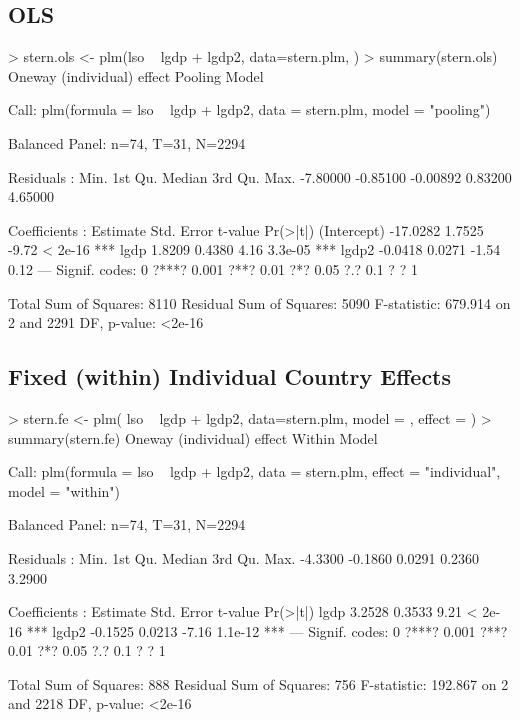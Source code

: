 \documentclass[landscape,letterpaper,9pt]{article}
\begin{document}
\subsection{OLS}
\begin{CVerbatim}
> stern.ols <- plm(lso ~ lgdp  + lgdp2, data=stern.plm, \fbox{\textcolor{red}{model = "pooling"}})
> summary(stern.ols)
Oneway (individual) effect Pooling Model

Call:
plm(formula = lso ~ lgdp + lgdp2, data = stern.plm, model = "pooling")

Balanced Panel: n=74, T=31, N=2294

Residuals :
    Min.  1st Qu.   Median  3rd Qu.     Max.
-7.80000 -0.85100 -0.00892  0.83200  4.65000

Coefficients :
            Estimate Std. Error t-value Pr(>|t|)
(Intercept) -17.0282     1.7525   -9.72  < 2e-16 ***
lgdp          1.8209     0.4380    4.16  3.3e-05 ***
lgdp2        -0.0418     0.0271   -1.54     0.12
---
Signif. codes:  0 ?***? 0.001 ?**? 0.01 ?*? 0.05 ?.? 0.1 ? ? 1

Total Sum of Squares:    8110
Residual Sum of Squares: 5090
F-statistic: 679.914 on 2 and 2291 DF, p-value: <2e-16

\end{CVerbatim}


\newpage
\subsection{Fixed (within) Individual Country Effects}
\begin{CVerbatim}
> stern.fe <- plm( lso ~ lgdp  + lgdp2, data=stern.plm,  
   model = \fbox{\textcolor{red}{"within"}}, effect = \fbox{\textcolor{red}{"individual"}})
> summary(stern.fe)
Oneway (individual) effect Within Model

Call:
plm(formula = lso ~ lgdp + lgdp2, data = stern.plm, effect = "individual",
    model = "within")

Balanced Panel: n=74, T=31, N=2294

Residuals :
   Min. 1st Qu.  Median 3rd Qu.    Max.
-4.3300 -0.1860  0.0291  0.2360  3.2900

Coefficients :
      Estimate Std. Error t-value Pr(>|t|)
lgdp    3.2528     0.3533    9.21  < 2e-16 ***
lgdp2  -0.1525     0.0213   -7.16  1.1e-12 ***
---
Signif. codes:  0 ?***? 0.001 ?**? 0.01 ?*? 0.05 ?.? 0.1 ? ? 1

Total Sum of Squares:    888
Residual Sum of Squares: 756
F-statistic: 192.867 on 2 and 2218 DF, p-value: <2e-16
\end{CVerbatim}
\end{document}
